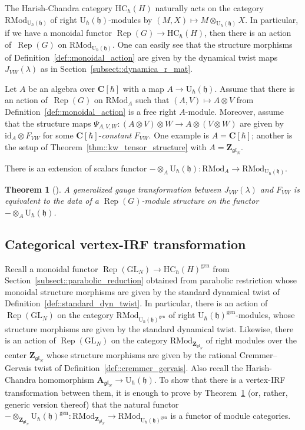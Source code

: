 \documentclass[pdftex]{sigma}
\numberwithin{equation}{section}
\newtheorem{Theorem}{Theorem}[section]
\newcommand{\C}{\mathbf{C}}
\newcommand{\U}{\mathrm{U}_{\hbar}}
\newcommand{\Z}{\mathbf{Z}}
\newcommand{\A}{\mathbf{A}}
\newcommand{\GL}{\mathrm{GL}}
\newcommand{\h}{\mathfrak{h}}
\newcommand{\gen}{\mathrm{gen}}
\newcommand{\HC}{\mathrm{HC}_{\hbar}}
\newcommand{\id}{\mathrm{id}}
\newcommand{\RMod}{\mathrm{RMod}}
\DeclareMathOperator{\Rep}{Rep}
\newcommand{\gl}{\mathfrak{gl}}
\begin{document}
	The Harish-Chandra category $\HC(H)$ naturally acts on the category $\RMod_{\U(\h)}$ of right $\U(\h)$-modules by
	$
	(M,X) \mapsto M \otimes_{\U(\h)} X$.
	In particular, if we have a monoidal functor $\Rep(G) \rightarrow \HC(H)$, then there is an action of~$\Rep(G)$ on $\RMod_{\U(\h)}$. One can easily see that the structure morphisms of Definition~\ref{def::monoidal_action} are given by the dynamical twist maps $J_{VW}(\lambda)$ as in Section~\ref{subsect::dynamica_r_mat}.
	
	Let $A$ be an algebra over $\C[\hbar]$ with a map $A\rightarrow \U(\h)$. Assume that there is an action of~$\Rep(G)$ on $\RMod_{A}$ such that $(A,V) \mapsto A \otimes V$ from Definition~\ref{def::monoidal_action} is a free right $A$-module. Moreover, assume that the structure maps $\Psi_{A,V,W}\colon (A \otimes V) \otimes W \rightarrow A \otimes (V \otimes W)$ are given by $\id_A \otimes F_{VW}$ for some $\C[\hbar]$-\emph{constant} $F_{VW}$. One example is $A=\C[\hbar]$; another is the setup of Theorem~\ref{thm::kw_tensor_structure} with $A = \Z_{\gl_N}$.
	
	There is an extension of scalars functor $- \otimes_A \U(\h) \colon \RMod_{A} \rightarrow \RMod_{\U(\h)}$.
	\begin{Theorem}[{\cite[Proposition 2.4.3]{Kalmykov}}]
		\label{thm::vertex-irf}
		A generalized gauge transformation between $J_{VW}(\lambda)$ and $F_{VW}$ is equivalent to the data of a $\Rep(G)$-module structure on the functor $-\otimes_A \U(\h)$.
	\end{Theorem}
	
	\subsection{Categorical vertex-IRF transformation}
	
	Recall a monoidal functor $\Rep(\GL_N) \rightarrow \HC(H)^{\gen}$ from Section~\ref{subsect::parabolic_reduction} obtained from parabolic restriction whose monoidal structure morphisms are given by the standard dynamical twist of Definition~\ref{def::standard_dyn_twist}. In particular, there is an action of $\Rep(\GL_N)$ on the category $\RMod_{\U(\h)^{\gen}}$ of right $\U(\h)^{\gen}$-modules, whose structure morphisms are given by the standard dynamical twist. Likewise, there is an action of $\Rep(\GL_N)$ on the category $\RMod_{\Z_{\gl_N}}$ of right modules over the center $\Z_{\gl_N}$ whose structure morphisms are given by the rational Cremmer--Gervais twist of Definition~\ref{def::cremmer_gervais}. Also recall the Harish-Chandra homomorphism $\A_{\gl_{N}} \rightarrow \U(\h)$. To show that there is a vertex-IRF transformation between them, it is enough to prove by Theorem~\ref{thm::vertex-irf} (or, rather, generic version thereof) that the natural functor $- \otimes_{\Z_{\gl_N}} \U(\h)^{\gen}\colon \RMod_{\Z_{\gl_N}} \rightarrow \RMod_{\U(\h)^{\gen}}$ is a functor of module categories.
	
\end{document}
